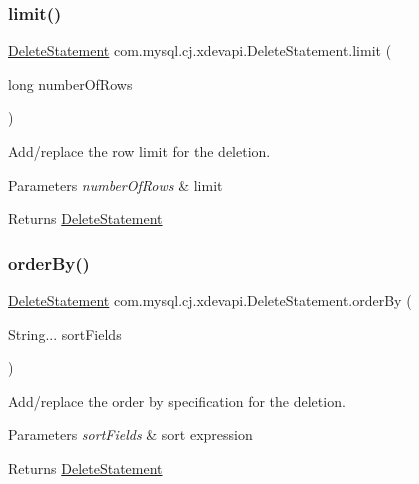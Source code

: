 \subsubsection{\texorpdfstring{limit()}{limit()}}
{\footnotesize\ttfamily \mbox{\hyperlink{interfacecom_1_1mysql_1_1cj_1_1xdevapi_1_1_delete_statement}{Delete\+Statement}} com.\+mysql.\+cj.\+xdevapi.\+Delete\+Statement.\+limit (\begin{DoxyParamCaption}\item[{long}]{number\+Of\+Rows }\end{DoxyParamCaption})}

Add/replace the row limit for the deletion.


\begin{DoxyParams}{Parameters}
{\em number\+Of\+Rows} & limit \\
\hline
\end{DoxyParams}
\begin{DoxyReturn}{Returns}
\mbox{\hyperlink{interfacecom_1_1mysql_1_1cj_1_1xdevapi_1_1_delete_statement}{Delete\+Statement}} 
\end{DoxyReturn}
\mbox{\label{interfacecom_1_1mysql_1_1cj_1_1xdevapi_1_1_delete_statement_aa2f42b5eaf29813d63a78cc6a5f553a7}} 
\subsubsection{\texorpdfstring{order\+By()}{orderBy()}}
{\footnotesize\ttfamily \mbox{\hyperlink{interfacecom_1_1mysql_1_1cj_1_1xdevapi_1_1_delete_statement}{Delete\+Statement}} com.\+mysql.\+cj.\+xdevapi.\+Delete\+Statement.\+order\+By (\begin{DoxyParamCaption}\item[{String...}]{sort\+Fields }\end{DoxyParamCaption})}

Add/replace the order by specification for the deletion.


\begin{DoxyParams}{Parameters}
{\em sort\+Fields} & sort expression \\
\hline
\end{DoxyParams}
\begin{DoxyReturn}{Returns}
\mbox{\hyperlink{interfacecom_1_1mysql_1_1cj_1_1xdevapi_1_1_delete_statement}{Delete\+Statement}} 
\end{DoxyReturn}
\mbox{\label{interfacecom_1_1mysql_1_1cj_1_1xdevapi_1_1_delete_statement_ab8e3a9ff4710cb66ffa5aba7740700af}} 
